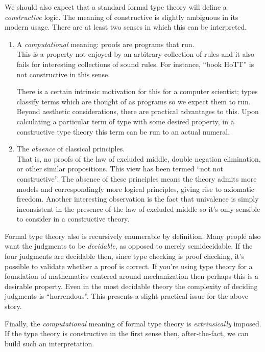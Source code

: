\documentclass{article}
\begin{document}
We should also expect that a standard formal type theory will define a
\emph{constructive} logic. The meaning of constructive is slightly ambiguous
in its modern usage. There are at least two senses in which this can be
interpreted.
\begin{enumerate}
\item A \emph{computational} meaning: proofs are programs that run.\\
  This is a property not enjoyed by an arbitrary collection of rules
  and it also fails for interesting collections of sound rules. For
  instance, ``book HoTT'' is not constructive in this sense.

  There is a certain intrinsic motivation for this for a computer
  scientist; types classify terms which are thought of as programs so
  we expect them to run. Beyond aesthetic considerations, there are
  practical advantages to this. Upon calculating a particular term of
  type \nat{} with some desired property, in a constructive type
  theory this term can be run to an actual numeral.

\item The \emph{absence} of classical principles.\\
  That is, no proofs of the law of excluded middle, double negation
  elimination, or other similar propositions. This view has been
  termed ``not not constructive''. The absence of these principles
  means the theory admits more models and correspondingly more logical
  principles, giving rise to axiomatic freedom. Another interesting
  observation is the fact that univalence is simply inconsistent in
  the presence of the law of excluded middle so it's only sensible to
  consider in a constructive theory.
\end{enumerate}
Formal type theory also is recursively enumerable by definition. Many
people also want the judgments to be \emph{decidable}, as opposed to merely
semidecidable. If the four judgments are decidable then, since type
checking is proof checking, it's possible to validate whether a proof
is correct. If you're using type theory for a foundation of
mathematics centered around mechanization then perhaps this is a
desirable property. Even in the most decidable theory the complexity of
deciding judgments is ``horrendous''. This presents a slight practical
issue for the above story.

Finally, the \emph{computational} meaning of formal type theory is \emph{extrinsically}
imposed.  If the type theory is constructive in
the first sense then, after-the-fact, we can build such an
interpretation.
\end{document}
